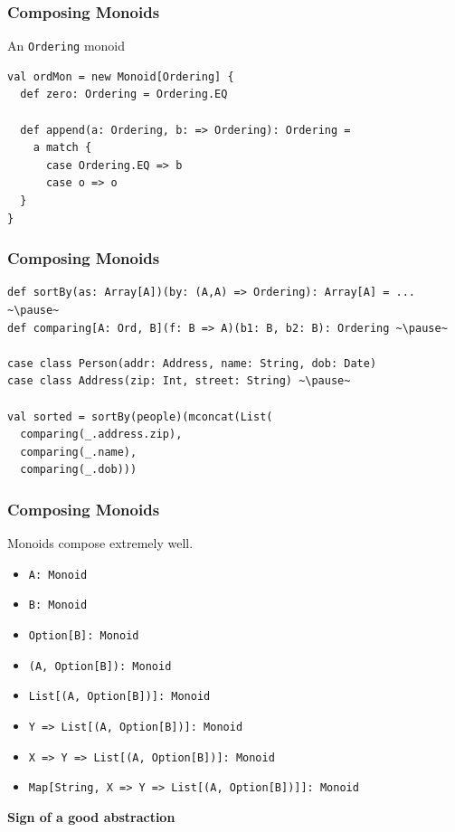 \documentclass{beamer}
\begin{document}
\begin{frame}[fragile]
  \frametitle{Composing Monoids}
  \begin{block}{An \texttt{Ordering} monoid}
  \begin{lstlisting}
val ordMon = new Monoid[Ordering] {
  def zero: Ordering = Ordering.EQ

  def append(a: Ordering, b: => Ordering): Ordering =
    a match {
      case Ordering.EQ => b
      case o => o
  }
}
  \end{lstlisting}
  \end{block}
\end{frame}

\begin{frame}[fragile]
  \frametitle{Composing Monoids}
  \begin{block}{}
  \begin{lstlisting}
def sortBy(as: Array[A])(by: (A,A) => Ordering): Array[A] = ... ~\pause~
def comparing[A: Ord, B](f: B => A)(b1: B, b2: B): Ordering ~\pause~

case class Person(addr: Address, name: String, dob: Date)
case class Address(zip: Int, street: String) ~\pause~

val sorted = sortBy(people)(mconcat(List(
  comparing(_.address.zip),
  comparing(_.name),
  comparing(_.dob)))

  \end{lstlisting}
  \end{block}
\end{frame}
\fi

\begin{frame}
  \frametitle{Composing Monoids}
  Monoids compose extremely well.
  \begin{itemize}
    \item \texttt{A: Monoid}
    \item \texttt{B: Monoid}
      \pause
    \item \texttt{Option[B]: Monoid}
      \pause
    \item \texttt{(A, Option[B]): Monoid}
    \item \texttt{List[(A, Option[B])]: Monoid}
      \pause
    \item \texttt{Y => List[(A, Option[B])]: Monoid}
      \pause
    \item \texttt{X => Y => List[(A, Option[B])]: Monoid}
    \item \texttt{Map[String, X => Y => List[(A, Option[B])]]: Monoid}
  \end{itemize}
  \begin{block}{}
    \centering
    \Large \textbf{Sign of a good abstraction}
  \end{block}
\end{frame}
\end{document}
